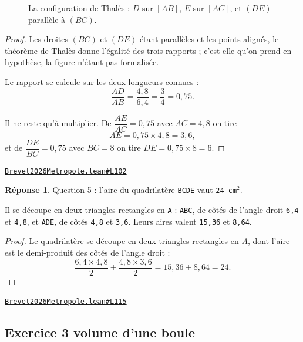 \documentclass[11pt,a4paper]{article}
\theoremstyle{definition}
\theoremstyle{plain}
\theoremstyle{definition}
\newtheorem*{reponse}{Réponse}
\newcommand{\source}[2]{\par\smallskip\noindent\hfill{\footnotesize\href{#1}{\texttt{#2}}}\par\smallskip}
\begin{document}
\begin{figure}[h]
\centering

\caption{La configuration de Thalès : \(D\) sur \([AB]\), \(E\) sur \([AC]\), et \((DE)\) parallèle à \((BC)\).}
\end{figure}
\begin{proof}
Les droites $(BC)$ et $(DE)$ étant parallèles et les points alignés, le théorème de
Thalès donne l'égalité des trois rapports ; c'est elle qu'on prend en hypothèse, la figure
n'étant pas formalisée.

Le rapport se calcule sur les deux longueurs connues :
\[ \frac{AD}{AB} = \frac{4{,}8}{6{,}4} = \frac{3}{4} = 0{,}75 . \]

Il ne reste qu'à multiplier. De $\dfrac{AE}{AC} = 0{,}75$ avec $AC = 4{,}8$ on tire
\[ AE = 0{,}75 \times 4{,}8 = 3{,}6 , \]
et de $\dfrac{DE}{BC} = 0{,}75$ avec $BC = 8$ on tire $DE = 0{,}75 \times 8 = 6$.
\end{proof}
\source{https://github.com/Commutator-IO/learn-lean/blob/main/exams/2026/Brevet2026Metropole.lean\#L102}{Brevet2026Metropole.lean\#L102}

\begin{reponse}
Question 5 : l'aire du quadrilatère \texttt{BCDE} vaut \texttt{24 cm\(^{2}\)}.

Il se découpe en deux triangles rectangles en \texttt{A} : \texttt{ABC}, de côtés de l'angle
droit \texttt{6,4} et \texttt{4,8}, et \texttt{ADE}, de côtés \texttt{4,8} et \texttt{3,6}. Leurs aires valent
\texttt{15,36} et \texttt{8,64}.
\end{reponse}
\begin{proof}
Le quadrilatère se découpe en deux triangles rectangles en $A$, dont l'aire est le
demi-produit des côtés de l'angle droit :
\[ \frac{6{,}4 \times 4{,}8}{2} + \frac{4{,}8 \times 3{,}6}{2}
   = 15{,}36 + 8{,}64 = 24 . \]
\end{proof}
\source{https://github.com/Commutator-IO/learn-lean/blob/main/exams/2026/Brevet2026Metropole.lean\#L115}{Brevet2026Metropole.lean\#L115}

\subsection{Exercice 3 \textemdash{} volume d'une boule}
\end{document}
